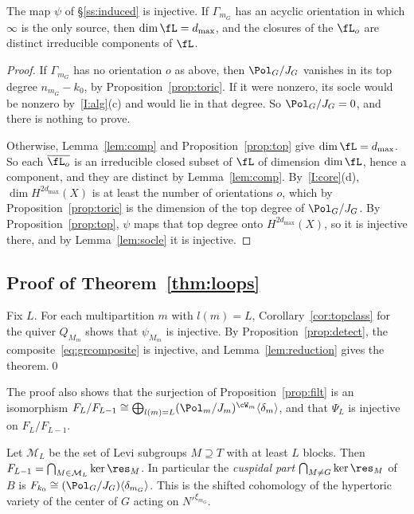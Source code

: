 \documentclass[11pt]{amsart}
\begin{document}
\begin{corollary}\label{cor:topclass}
The map $\psi$ of \S\ref{ss:induced} is injective.  If $\Gamma_{m_G}$ has an
acyclic orientation in which $\infty$ is the only source, then
$\dim\fL=d_{\max}$, and the closures of the $\fL_o$ are distinct irreducible
components of $\fL$.
\end{corollary}

\begin{proof}
If $\Gamma_{m_G}$ has no orientation $o$ as above, then $\Pol_G/J_G$ vanishes
in its top degree $n_{m_G}-k_0$, by Proposition~\ref{prop:toric}.  If it were
nonzero, its socle would be nonzero by~\ref{I:alg}(c) and would lie in that
degree.  So $\Pol_G/J_G=0$, and there is nothing to prove.

Otherwise, Lemma~\ref{lem:comp} and Proposition~\ref{prop:top} give
$\dim\fL=d_{\max}$.  So each $\overline{\fL_o}$ is an irreducible closed
subset of $\fL$ of dimension $\dim\fL$, hence a component, and they are
distinct by Lemma~\ref{lem:comp}.  By~\ref{I:core}(d), $\dim
H^{2d_{\max}}(X)$ is at least the number of orientations $o$, which by
Proposition~\ref{prop:toric} is the dimension of the top degree of
$\Pol_G/J_G$.  By Proposition~\ref{prop:top}, $\psi$ maps that top degree onto
$H^{2d_{\max}}(X)$, so it is injective there, and by Lemma~\ref{lem:socle} it
is injective.
\end{proof}

\subsection{Proof of Theorem~\ref{thm:loops}}\label{ss:proof}
Fix $L$.  For each multipartition $m$ with $l(m)=L$,
Corollary~\ref{cor:topclass} for the quiver $Q_{M_m}$ shows that $\psi_{M_m}$
is injective.  By Proposition~\ref{prop:detect}, the
composite~\eqref{eq:grcomposite} is injective, and
Lemma~\ref{lem:reduction} gives the theorem.\qed

\medskip
The proof also shows that the surjection of Proposition~\ref{prop:filt} is an
isomorphism
$F_L/F_{L-1}\cong\bigoplus_{l(m)=L}(\Pol_m/J_m)^{\cW_m}\langle\delta_m\rangle$, and
that $\Psi_L$ is injective on $F_L/F_{L-1}$.

\begin{corollary}\label{cor:cusp}
Let $\mathcal M_L$ be the set of Levi subgroups $M\supseteq T$ with at
least $L$ blocks.  Then $F_{L-1}=\bigcap_{M\in\mathcal M_L}\ker\res_M$.  In
particular the \emph{cuspidal part}
$\bigcap_{M\neq G}\ker\res_M$ of $B$ is $F_{k_0}\cong(\Pol_G/J_G)\langle\delta_{m_G}\rangle$.
This is the shifted cohomology of the hypertoric variety of the center of
$G$ acting on $N'^{\xi_{m_G}}$.
\end{corollary}
\end{document}
